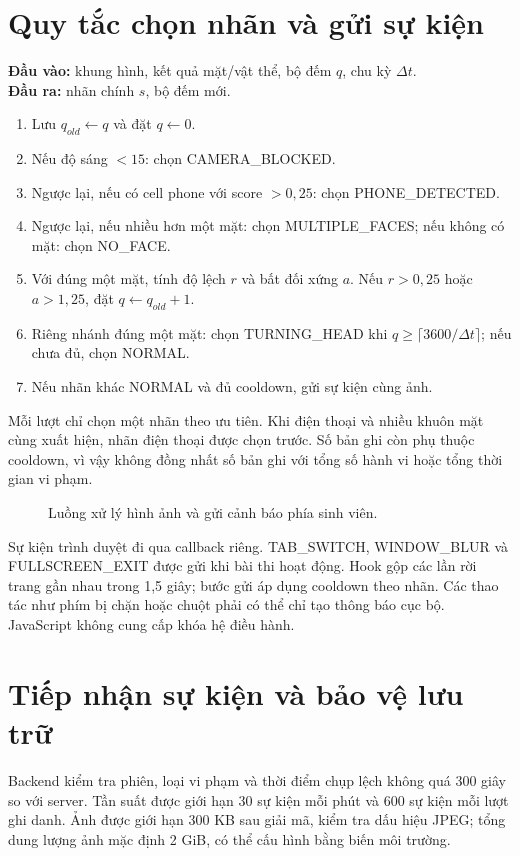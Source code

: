 \section{Quy tắc chọn nhãn và gửi sự kiện}
\begin{algorithm}[H]
\caption{Chọn trạng thái giám sát từ một lượt phân tích}
\begin{minipage}{0.94\linewidth}
\small
\textbf{Đầu vào:} khung hình, kết quả mặt/vật thể, bộ đếm $q$, chu kỳ $\Delta t$.\\
\textbf{Đầu ra:} nhãn chính $s$, bộ đếm mới.
\begin{enumerate}[leftmargin=1.6em,itemsep=2pt]
\item Lưu $q_{old}\gets q$ và đặt $q\gets0$.
\item Nếu độ sáng $<15$: chọn CAMERA\_BLOCKED.
\item Ngược lại, nếu có cell phone với score $>0{,}25$: chọn PHONE\_DETECTED.
\item Ngược lại, nếu nhiều hơn một mặt: chọn MULTIPLE\_FACES; nếu không có mặt: chọn NO\_FACE.
\item Với đúng một mặt, tính độ lệch $r$ và bất đối xứng $a$. Nếu $r>0{,}25$ hoặc $a>1{,}25$, đặt $q\gets q_{old}+1$.
\item Riêng nhánh đúng một mặt: chọn TURNING\_HEAD khi $q\geq\lceil3600/\Delta t\rceil$; nếu chưa đủ, chọn NORMAL.
\item Nếu nhãn khác NORMAL và đủ cooldown, gửi sự kiện cùng ảnh.
\end{enumerate}
\end{minipage}
\end{algorithm}

Mỗi lượt chỉ chọn một nhãn theo ưu tiên. Khi điện thoại và nhiều khuôn mặt cùng xuất hiện, nhãn điện thoại được chọn trước. Số bản ghi còn phụ thuộc cooldown, vì vậy không đồng nhất số bản ghi với tổng số hành vi hoặc tổng thời gian vi phạm.
\begin{figure}[H]\centering
\caption{Luồng xử lý hình ảnh và gửi cảnh báo phía sinh viên.}\end{figure}

Sự kiện trình duyệt đi qua callback riêng. TAB\_SWITCH, WINDOW\_BLUR và FULLSCREEN\_EXIT được gửi khi bài thi hoạt động. Hook gộp các lần rời trang gần nhau trong 1,5 giây; bước gửi áp dụng cooldown theo nhãn. Các thao tác như phím bị chặn hoặc chuột phải có thể chỉ tạo thông báo cục bộ. JavaScript không cung cấp khóa hệ điều hành.

\section{Tiếp nhận sự kiện và bảo vệ lưu trữ}
Backend kiểm tra phiên, loại vi phạm và thời điểm chụp lệch không quá 300 giây so với server. Tần suất được giới hạn 30 sự kiện mỗi phút và 600 sự kiện mỗi lượt ghi danh. Ảnh được giới hạn 300 KB sau giải mã, kiểm tra dấu hiệu JPEG; tổng dung lượng ảnh mặc định 2 GiB, có thể cấu hình bằng biến môi trường.

